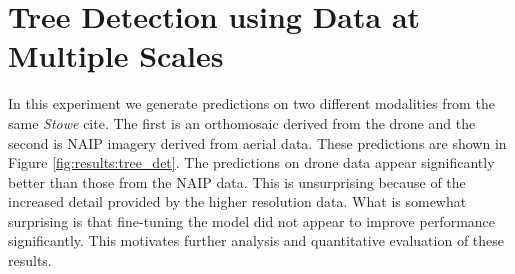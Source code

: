 \section{Tree Detection using Data at Multiple Scales}
In this experiment we generate predictions on two different modalities from the same \textit{Stowe} cite. The first is an orthomosaic derived from the drone and the second is NAIP imagery derived from aerial data. These predictions are shown in Figure \ref{fig:results:tree_det}. 
The predictions on drone data appear significantly better than those from the NAIP data. This is unsurprising because of the increased detail provided by the higher resolution data. What is somewhat surprising is that fine-tuning the model did not appear to improve performance significantly. This motivates further analysis and quantitative evaluation of these results.

